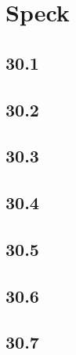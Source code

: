 \part{Speck}
 \chapter{30.1}
 \chapter{30.2}
 \chapter{30.3}
 \chapter{30.4}
 \chapter{30.5}
 \chapter{30.6}
 \chapter{30.7}








